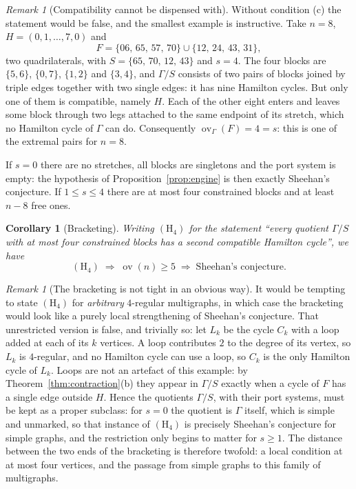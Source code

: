 \documentclass[11pt,a4paper]{article}
\newtheorem{corollary}[theorem]{Corollary}
\theoremstyle{definition}
\theoremstyle{remark}
\newtheorem{remark}[theorem]{Remark}
\newcommand{\ov}{\operatorname{ov}}
\begin{document}
\begin{remark}[Compatibility cannot be dispensed with]\label{rem:ports}
Without condition (c) the statement would be false, and the smallest example is instructive. Take $n=8$, $H=(0,1,\dots,7,0)$ and
\[
F=\{06,\,65,\,57,\,70\}\cup\{12,\,24,\,43,\,31\},
\]
two quadrilaterals, with $S=\{65,\,70,\,12,\,43\}$ and $s=4$. The four blocks are $\{5,6\}$, $\{0,7\}$, $\{1,2\}$ and $\{3,4\}$, and $\Gamma/S$ consists of two pairs of blocks joined by triple edges together with two single edges: it has nine Hamilton cycles. But only one of them is compatible, namely $H$. Each of the other eight enters and leaves some block through two legs attached to the same endpoint of its stretch, which no Hamilton cycle of $\Gamma$ can do. Consequently $\ov_\Gamma(F)=4=s$: this is one of the extremal pairs for $n=8$.
\end{remark}

If $s=0$ there are no stretches, all blocks are singletons and the port system is empty: the hypothesis of Proposition~\ref{prop:engine} is then exactly Sheehan's conjecture. If $1\le s\le4$ there are at most four constrained blocks and at least $n-8$ free ones.

\begin{corollary}[Bracketing]\label{cor:bracket}
Writing $(\mathrm{H}_4)$ for the statement ``every quotient $\Gamma/S$ with at most four constrained blocks has a second compatible Hamilton cycle'', we have
\[
(\mathrm{H}_4)
\;\Longrightarrow\;
\ov(n)\ge5
\;\Longrightarrow\;
\text{Sheehan's conjecture}.
\]
\end{corollary}

\begin{remark}[The bracketing is not tight in an obvious way]\label{rem:bracket}
It would be tempting to state $(\mathrm{H}_4)$ for \emph{arbitrary} $4$-regular multigraphs, in which case the bracketing would look like a purely local strengthening of Sheehan's conjecture. That unrestricted version is false, and trivially so: let $L_k$ be the cycle $C_k$ with a loop added at each of its $k$ vertices. A loop contributes $2$ to the degree of its vertex, so $L_k$ is $4$-regular, and no Hamilton cycle can use a loop, so $C_k$ is the only Hamilton cycle of $L_k$. Loops are not an artefact of this example: by Theorem~\ref{thm:contraction}(b) they appear in $\Gamma/S$ exactly when a cycle of $F$ has a single edge outside $H$. Hence the quotients $\Gamma/S$, with their port systems, must be kept as a proper subclass: for $s=0$ the quotient is $\Gamma$ itself, which is simple and unmarked, so that instance of $(\mathrm{H}_4)$ is precisely Sheehan's conjecture for simple graphs, and the restriction only begins to matter for $s\ge1$. The distance between the two ends of the bracketing is therefore twofold: a local condition at at most four vertices, and the passage from simple graphs to this family of multigraphs.
\end{remark}
\end{document}
